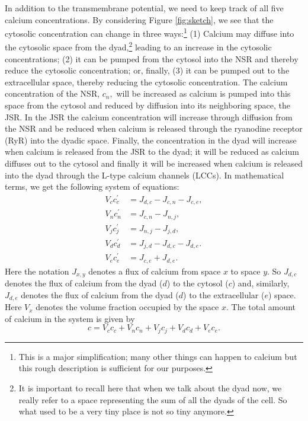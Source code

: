 \bigskip
In addition to the transmembrane potential, we need to keep track of
all five calcium concentrations.
By considering Figure \ref{fig:sketch}, we see that the cytosolic concentration can change in
three ways:\footnote{This is a major simplification; many other things can
happen to calcium but this rough description is sufficient for our purposes.
} (1) Calcium may diffuse into the cytosolic space from the
dyad,\footnote{It is important to recall here that when we talk about the dyad
now, we really refer to a space representing the sum of all the dyads of the
cell. So what used to be a very tiny place is not so tiny anymore.} leading to
an increase in the cytosolic concentrations; (2) it can be pumped from the cytosol into the
NSR and thereby reduce the cytosolic concentration; or, finally, (3) it can be
pumped out to the extracellular space, thereby reducing the cytosolic
concentration. The calcium concentration of the NSR, $c_{n},$ will be
increased as calcium is pumped into this space from the cytosol and reduced
by diffusion into its neighboring space, the JSR. In the JSR the calcium
concentration will increase through diffusion from the NSR and be reduced when
calcium is released through the ryanodine receptor (RyR) into the dyadic space. Finally, the
concentration in the dyad will increase when calcium is released from the JSR
to the dyad; it will be reduced as calcium diffuses out to the cytosol and
finally it will be increased when calcium is released into the dyad through
the L-type calcium channels (LCCs). In mathematical terms, we get the following system of
equations:
\begin{align}
V_{c}c_{c}^{\prime}  & =J_{d,c}-J_{c,n}-J_{c,e},\label{c51}\\
V_{n}c_{n}^{\prime}  & =J_{c,n}-J_{n,j},\label{c52}\\
V_{j}c_{j}^{\prime}  & =J_{n,j}-J_{j,d},\label{c53}\\
V_{d}c_{d}^{\prime}  & =J_{j,d}-J_{d,c}-J_{d,e}.\label{c54} \\
V_{e}c_{e}^{\prime}  & =J_{c,e}+J_{d,e}.\label{c55}
\end{align}
Here the notation $J_{x,y}$ denotes a flux of calcium from space $x$ to
space $y.$ So $J_{d,c}$ denotes the flux of calcium from the dyad ($d$) to
the cytosol ($c$) and, similarly, $J_{d,e}$ denotes the flux of calcium from
the  dyad ($d$)  to the extracellular ($e$) space. Here $V_{x}$ denotes the
volume fraction occupied by the space $x.$  The total amount of calcium in the system is given by
\begin{equation}
c=V_{c}c_{c}+V_{n}c_{n}+V_{j}c_{j}+V_{d}c_{d}+V_{e}c_{e}. \label{tot_ca}
\end{equation}



